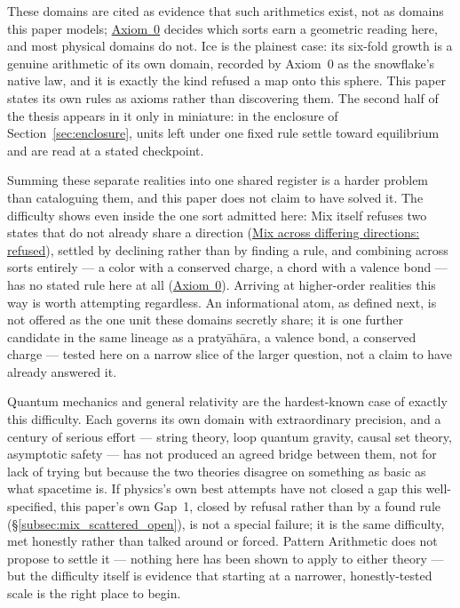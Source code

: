 \documentclass[12pt, a4paper]{article}
\begin{document}
These domains are cited as evidence that such arithmetics exist, not
as domains this paper models;
\hyperref[subsec:axiom0_admissibility]{Axiom~0} decides which sorts
earn a geometric reading here, and most physical domains do not.
Ice is the plainest case: its six-fold growth is a genuine arithmetic
of its own domain, recorded by Axiom~0 as the snowflake's native law,
and it is exactly the kind refused a map onto this sphere. This
paper states its own rules as axioms rather than discovering them.
The second half of the thesis appears in it only in miniature: in the
enclosure of Section~\ref{sec:enclosure}, units left under one fixed rule settle toward equilibrium and are read at a stated checkpoint.

Summing these separate realities into one shared register is a
harder problem than cataloguing them, and this paper does not claim
to have solved it. The difficulty shows even inside the one sort
admitted here: Mix itself refuses two states that do not already
share a direction
(\hyperref[subsec:mix_scattered_open]{Mix across differing
directions: refused}), settled by declining rather than by finding a
rule, and combining across sorts entirely --- a color with a
conserved charge, a chord with a valence bond --- has no stated rule
here at all (\hyperref[subsec:axiom0_admissibility]{Axiom~0}).
Arriving at higher-order realities this way is worth attempting
regardless. An informational atom, as defined next, is not offered
as the one unit these domains secretly share; it is one further
candidate in the same lineage as a pratyāhāra, a valence bond, a
conserved charge --- tested here on a narrow slice of the larger
question, not a claim to have already answered it.

Quantum mechanics and general relativity are the hardest-known case
of exactly this difficulty. Each governs its own domain with
extraordinary precision, and a century of serious effort --- string
theory, loop quantum gravity, causal set theory, asymptotic safety
--- has not produced an agreed bridge between them, not for lack of
trying but because the two theories disagree on something as basic
as what spacetime is. If physics's own best attempts have not closed
a gap this well-specified, this paper's own Gap~1, closed by refusal
rather than by a found rule
(\S\ref{subsec:mix_scattered_open}), is not a special failure; it is
the same difficulty, met honestly rather than talked around or
forced. Pattern Arithmetic does not propose to settle
it --- nothing here has been shown to apply to either theory --- but
the difficulty itself is evidence that starting at a narrower,
honestly-tested scale is the right place to begin.
\end{document}
